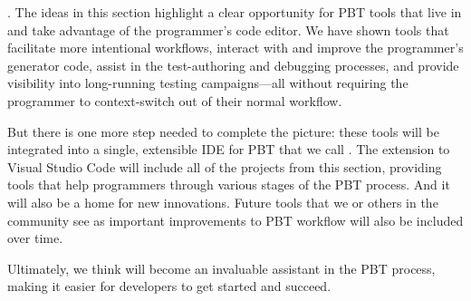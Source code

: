 
.
The ideas in this section highlight a clear opportunity for PBT tools that live
in and take advantage of the programmer's code editor. We have shown tools that
facilitate more intentional workflows, interact with and improve the
programmer's generator code, assist in the test-authoring and debugging
processes, and provide visibility into long-running testing campaigns---all
without requiring the programmer to context-switch out of their normal workflow.

But there is one more step needed to complete the picture: these tools will be
integrated into a single, extensible IDE for PBT that we call \tyche. The \tyche{}
extension to Visual Studio Code will include all of the projects from this
section, providing tools that help programmers through various stages of the PBT
process. And it will also be a home for new innovations. Future tools that we
or others in the community see as important improvements to PBT workflow will
also be included over time.

Ultimately, we think \tyche{} will become an invaluable assistant in the PBT
process, making it easier for developers to get started and succeed.
\iflater {} \fi



